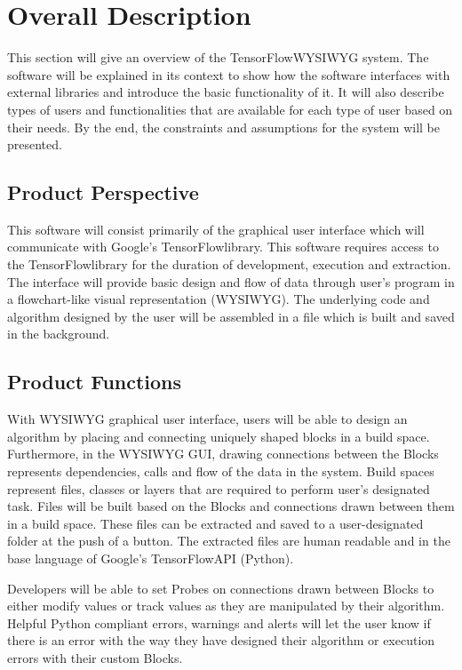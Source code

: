 \documentclass[journal,10pt,onecolumn,compsoc]{IEEEtran} \usepackage[margin=1.0in]{geometry} \usepackage{pdfpages} \usepackage{graphicx}
\begin{document}
\newpage

\section{Overall Description}

This section will give an overview of the TensorFlow\texttrademark WYSIWYG system. 
The software will be explained in its context to show how the software interfaces with external libraries and introduce the basic functionality of it. 
It will also describe types of users  and functionalities that are available for each type of user based on their needs. 
By the end, the constraints and assumptions for the system will be presented.

\subsection{Product Perspective}

This software will consist primarily of the graphical user interface which will communicate with Google's TensorFlow\texttrademark library. 
This software requires access to the TensorFlow\texttrademark library for the duration of development, execution and extraction. 
The interface will provide basic design and flow of data through user's program in a flowchart-like visual representation (WYSIWYG).
The underlying code and algorithm designed by the user will be assembled in a file which is built and saved in the background. 

\subsection{Product Functions}

With WYSIWYG graphical user interface, users will be able to design an algorithm by placing and connecting uniquely shaped blocks in a build space.
Furthermore, in the WYSIWYG GUI, drawing connections between the Blocks represents dependencies, calls and flow of the data in the system.
Build spaces represent files, classes or layers that are required to perform user's designated task.
Files will be built based on the Blocks and connections drawn between them in a build space.
These files can be extracted and saved to a user-designated folder at the push of a button.
The extracted files are human readable and in the base language of Google's TensorFlow\texttrademark API (Python).

\noindent Developers will be able to set Probes on connections drawn between Blocks to either modify values or track values as they are manipulated by their algorithm.
Helpful Python compliant errors, warnings and alerts will let the user know if there is an error with the way they have designed their algorithm or execution errors with their custom Blocks.
\end{document}
